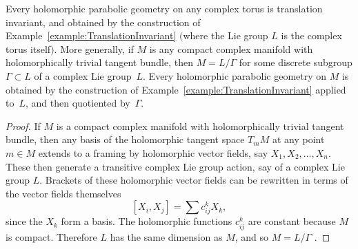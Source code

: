 \documentclass[pdftex]{sigma}
\begin{document}
\begin{theorem}\label{theorem:translation}
Every holomorphic parabolic geometry on any complex torus is translation
inva\-riant, and obtained by the construction of
Example~{\rm \ref{example:TranslationInvariant}}
$($where the Lie group $L$ is the complex torus itself$)$.
More generally, if $M$ is any compact complex
manifold with holomorphically trivial tangent bundle,
then $M=L/\Gamma$ for some discrete
subgroup $\Gamma \subset L$ of a complex
Lie group~$L$. Every holomorphic parabolic geometry
on $M$ is obtained by the construction of
Example~{\rm \ref{example:TranslationInvariant}}
applied to~$L$, and then quotiented by~$\Gamma$.
\end{theorem}

\begin{proof}
If $M$ is a compact complex manifold with holomorphically
trivial tangent bundle, then any basis of the
holomorphic tangent space $T_m M$ at any point $m \in M$
extends to a framing by holomorphic vector f\/ields, say $X_1, X_2, \dots, X_n$.
These then generate a transitive complex Lie group action,
say of a complex Lie group $L$. Brackets of these
holomorphic vector f\/ields can be rewritten in terms
of the vector f\/ields themselves
\[
\left[X_i,X_j\right]=\sum c^k_{ij} X_k,
\]
since the $X_k$ form a basis. The holomorphic functions
$c^k_{ij}$ are constant because $M$ is compact. Therefore $L$ has the same
dimension as $M$, and so $M = L/\Gamma$ \cite{Wang:1954}.


\end{proof}
\end{document}
